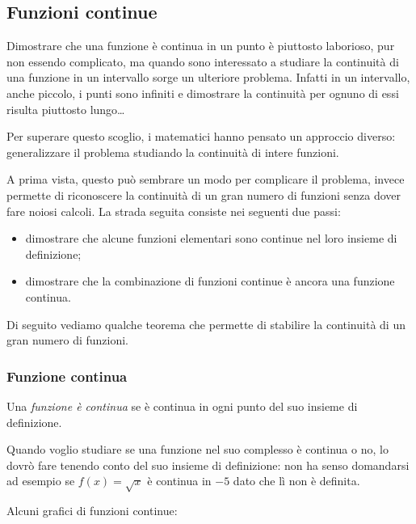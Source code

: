 \subsection{Funzioni continue}
\label{subsec:cont_definizione}

Dimostrare che una funzione è continua in un punto è piuttosto laborioso, 
pur non essendo complicato, ma quando sono interessato a studiare la 
continuità di una funzione in un intervallo sorge un ulteriore problema. 
Infatti in un intervallo, anche piccolo, i punti sono infiniti e dimostrare 
la continuità per ognuno di essi risulta piuttosto lungo\dots

Per superare questo scoglio, i matematici hanno pensato un approccio 
diverso:
generalizzare il problema studiando la continuità di intere funzioni.

A prima vista, questo può sembrare un modo per complicare il problema, 
invece permette di riconoscere la continuità di un gran numero di 
funzioni senza dover fare noiosi calcoli. La strada seguita consiste nei 
seguenti due passi:
\begin{itemize} [noitemsep]
\item dimostrare che alcune funzioni elementari sono continue nel loro 
insieme di definizione;
\item dimostrare che la combinazione di funzioni continue è ancora una 
funzione continua.
\end{itemize}
Di seguito vediamo qualche teorema che permette di stabilire la continuità di 
un gran numero di funzioni.

\subsubsection{Funzione continua}
\label{subsubsec:cont_funzionecontinua}

\begin{definizione}
Una \emph{funzione è continua} se è continua in ogni punto del suo 
insieme di definizione.
\end{definizione}

Quando voglio studiare se una funzione nel suo complesso è continua o no, lo 
dovrò fare tenendo conto del suo insieme di definizione: non ha senso 
domandarsi ad esempio se \(f(x) = \sqrt{x}\) è continua in \(-5\) dato che lì 
non è definita.

Alcuni grafici di funzioni continue:

\hspace{-12mm}\begin{minipage}{.32\textwidth}
\begin{center} \scalebox{.9}{\contsecondo} \end{center}
\end{minipage}
\hfill
\begin{minipage}{.32\textwidth}
\begin{center} \contrad \end{center}
\end{minipage}
\hfill
\begin{minipage}{.32\textwidth}
\begin{center} \contip \end{center}
\end{minipage}


